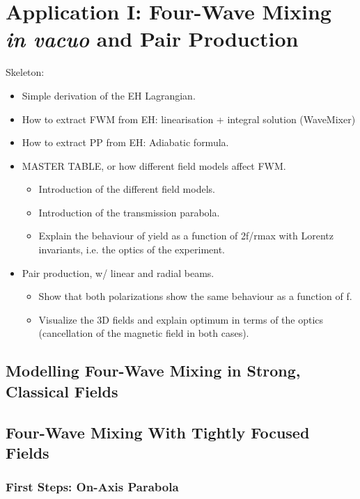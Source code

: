 \documentclass[11pt,SymmetricalJury]{inrsthesis/inrsthesis}
\begin{document}
\chapter{Application I: Four-Wave Mixing \textit{in vacuo} and Pair Production}


Skeleton:
\begin{itemize}
    \item Simple derivation of the EH Lagrangian.
    \item How to extract FWM from EH: linearisation + integral solution (WaveMixer)
    \item How to extract PP from EH: Adiabatic formula.
    \item MASTER TABLE, or how different field models affect FWM.
      \begin{itemize}
        \item Introduction of the different field models.
        \item Introduction of the transmission parabola.
        \item Explain the behaviour of yield as a function of 2f/rmax with Lorentz invariants,
              i.e. the optics of the experiment.
      \end{itemize}
    \item Pair production, w/ linear and radial beams.
      \begin{itemize}
          \item Show that both polarizations show the same behaviour as a function of f.
          \item Visualize the 3D fields and explain optimum in terms of the optics (cancellation of the
                magnetic field in both cases).
      \end{itemize}
\end{itemize}

\section{Modelling Four-Wave Mixing in Strong, Classical Fields}

\section{Four-Wave Mixing With Tightly Focused Fields}

\subsection{First Steps: On-Axis Parabola}
\end{document}

